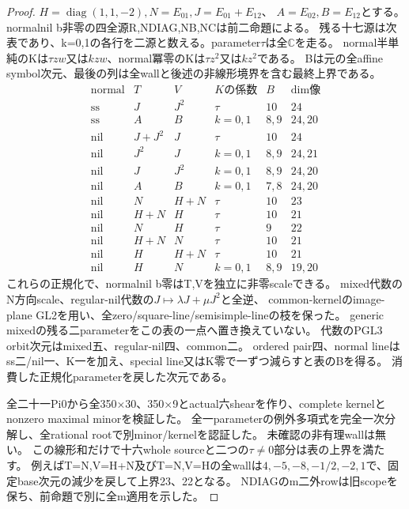 \documentclass[a4paper,11pt]{ltjsarticle}
\theoremstyle{definition}
\begin{document}
\begin{proof}
$H=\operatorname{diag}(1,1,-2),N=E_{01},J=E_{01}+E_{12}$、
$A=E_{02},B=E_{12}$とする。
normalnil b非零の四全源R,NDIAG,NB,NCは前二命題による。
残る十七源は次表であり、k=0,1の各行を二源と数える。parameter$\tau$は全$\mathbb C$を走る。
normal半単純のKは$\tau zw$又は$kzw$、normal冪零のKは$\tau z^2$又は$kz^2$である。
Bは元の全affine symbol次元、最後の列は全wallと後述の非線形境界を含む最終上界である。
\[
\begin{array}{c|c|c|c|c|c}
 \text{normal}&T&V&K\text{の係数}&B&\dim\text{像}\\\hline
 \mathrm{ss}&J&J^2&\tau&10&24\\
 \mathrm{ss}&A&B&k=0,1&8,9&24,20\\
 \mathrm{nil}&J+J^2&J&\tau&10&24\\
 \mathrm{nil}&J^2&J&k=0,1&8,9&24,21\\
 \mathrm{nil}&J&J^2&k=0,1&8,9&24,20\\
 \mathrm{nil}&A&B&k=0,1&7,8&24,20\\
 \mathrm{nil}&N&H+N&\tau&10&23\\
 \mathrm{nil}&H+N&H&\tau&10&21\\
 \mathrm{nil}&N&H&\tau&9&22\\
 \mathrm{nil}&H+N&N&\tau&10&21\\
 \mathrm{nil}&H&H+N&\tau&10&21\\
 \mathrm{nil}&H&N&k=0,1&8,9&19,20
\end{array}
\]
これらの正規化で、normalnil b零はT,Vを独立に非零scaleできる。
mixed代数のN方向scale、regular-nil代数の$J\mapsto\lambda J+\mu J^2$と全逆、
common-kernelのimage-plane GL2を用い、全zero/square-line/semisimple-lineの枝を保った。
generic mixedの残る二parameterをこの表の一点へ置き換えていない。
代数のPGL3 orbit次元はmixed五、regular-nil四、common二。
ordered pair四、normal lineはss二/nil一、K一を加え、special line又はK零で一ずつ減らすと表のBを得る。
消費した正規化parameterを戻した次元である。

全二十一Pi0から全350×30、350×9とactual六shearを作り、complete kernelとnonzero maximal minorを検証した。
全一parameterの例外多項式を完全一次分解し、全rational rootで別minor/kernelを認証した。
未確認の非有理wallは無い。
この線形和だけで十六whole sourceと二つの$\tau\ne0$部分は表の上界を満たす。
例えばT=N,V=H+N及びT=N,V=Hの全wallは$4,-5,-8,-1/2,-2,1$で、固定base次元の減少を戻して上界23、22となる。
NDIAGのm二外rowは旧scopeを保ち、前命題で別に全m適用を示した。


\end{proof}
\end{document}
